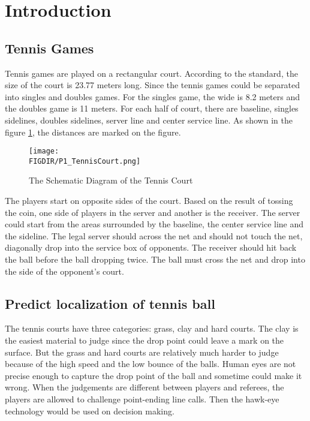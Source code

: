 
\section{Introduction}
\subsection{Tennis Games}
Tennis games are played on a rectangular court. According to the standard, the size of the court is 23.77 meters long. Since the tennis games could be separated into singles and doubles games. For the singles game, the wide is 8.2 meters and the doubles game is 11 meters. For each half of court, there are baseline, singles sidelines, doubles sidelines, server line and center service line. As shown in the figure \ref{Tennis court}, the distances are marked on the figure.

\begin{figure}[ht]
\centering
\texttt{[image: \\FIGDIR/P1\_TennisCourt.png]}
\caption{The Schematic Diagram of the Tennis Court}
\label{Tennis court}
\end{figure}

The players start on opposite sides of the court\cite{wiki:xxx}. Based on the result of tossing the coin, one side of players in the server and another is the receiver. The server could start from the areas surrounded by the baseline, the center service line and the sideline. The legal server should across the net and should not touch the net, diagonally drop into the service box of opponents. The receiver should hit back the ball before the ball dropping twice. The ball must cross the net and drop into the side of the opponent’s court.\\

\subsection{Predict localization of tennis ball}
The tennis courts have three categories: grass, clay and hard courts. The clay is the easiest material to judge since the drop point could leave a mark on the surface. But the grass and hard courts are relatively much harder to judge because of the high speed and the low bounce of the balls. Human eyes are not precise enough to capture the drop point of the ball and sometime could make it wrong. When the judgements are different between players and referees, the players are allowed to challenge point-ending line calls. Then the hawk-eye technology would be used on decision making.

